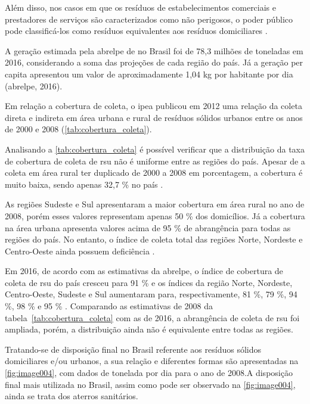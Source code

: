 	Além disso, nos casos em que os resíduos de estabelecimentos comerciais e prestadores de serviços são caracterizados como não perigosos, o poder público pode classificá-los como resíduos equivalentes aos resíduos domiciliares \cite{brasil:12305}.
	
	A geração estimada pela \gls{abrelpe} de  no Brasil foi de 78,3 milhões de toneladas em 2016, considerando a soma das projeções de cada região do país. Já a geração per capita apresentou um valor de aproximadamente 1,04 kg por habitante por dia (\gls{abrelpe}, 2016).
	
	Em relação a cobertura de coleta, o \gls{ipea} publicou em 2012 uma relação da coleta direta e indireta em área urbana e rural de resíduos sólidos urbanos entre os anos de 2000 e 2008 (\autoref{tab:cobertura_coleta}).
	
	
	
	Analisando a \autoref{tab:cobertura_coleta} é possível verificar que a distribuição da taxa de cobertura de coleta de \gls{rsu} não é uniforme entre as regiões do país. Apesar de a coleta em área rural ter duplicado de 2000 a 2008 em porcentagem, a cobertura é muito baixa, sendo apenas 32,7 \% no país \cite{IPEARSU2012}.
	
	As regiões Sudeste e Sul apresentaram a maior cobertura em área rural no ano de 2008, porém esses valores representam apenas 50 \% dos domicílios. Já a cobertura na área urbana apresenta valores acima de 95 \% de abrangência para todas as regiões do país. No entanto, o índice de coleta total das regiões Norte, Nordeste e Centro-Oeste ainda possuem deficiência \cite{IPEARSU2012}.
	
	Em 2016, de acordo com as estimativas da \gls{abrelpe}, o índice de cobertura de coleta de \gls{rsu} do país cresceu para 91 \% e os índices da região Norte, Nordeste, Centro-Oeste, Sudeste e Sul aumentaram para, respectivamente, 81 \%, 79 \%, 94 \%, 98 \% e 95 \% \cite{abrelpe:2016}. Comparando as estimativas de 2008 da tabela~\ref{tab:cobertura_coleta} com as de 2016, a abrangência de coleta de \gls{rsu} foi ampliada, porém, a distribuição ainda não é equivalente entre todas as regiões.
	
	Tratando-se de disposição final no Brasil referente aos resíduos sólidos domiciliares e/ou urbanos, a sua relação e diferentes formas são apresentadas na \autoref{fig:image004}, com dados de tonelada por dia para o ano de 2008.A disposição final mais utilizada no Brasil, assim como pode ser observado na \autoref{fig:image004}, ainda se trata dos aterros sanitários. 
	
